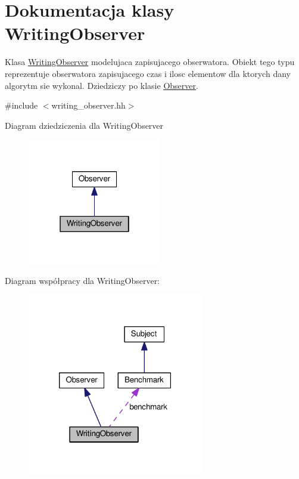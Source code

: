 \hypertarget{class_writing_observer}{\section{Dokumentacja klasy Writing\-Observer}
\label{class_writing_observer}
}


Klasa \hyperlink{class_writing_observer}{Writing\-Observer} modelujaca zapisujacego obserwatora. Obiekt tego typu reprezentuje obserwatora zapisujacego czas i ilosc elementow dla ktorych dany algorytm sie wykonal. Dziedziczy po klasie \hyperlink{class_observer}{Observer}.  




{\ttfamily \#include $<$writing\-\_\-observer.\-hh$>$}



Diagram dziedziczenia dla Writing\-Observer\nopagebreak
\begin{figure}[H]
\begin{center}
\leavevmode
\includegraphics[width=166pt]{class_writing_observer__inherit__graph}
\end{center}
\end{figure}


Diagram współpracy dla Writing\-Observer\-:\nopagebreak
\begin{figure}[H]
\begin{center}
\leavevmode
\includegraphics[width=219pt]{class_writing_observer__coll__graph}
\end{center}
\end{figure}
